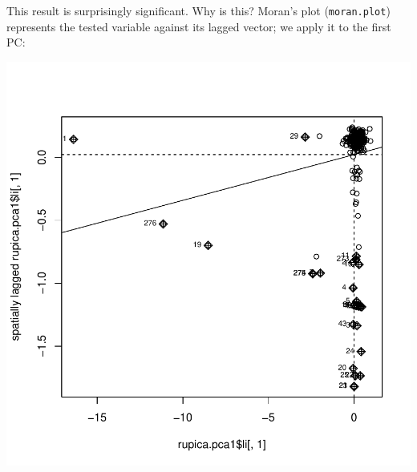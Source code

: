 \documentclass{article}
\begin{document}
\noindent This result is surprisingly significant. Why is this?
Moran's plot (\texttt{moran.plot}) represents the tested variable against its lagged vector; we
apply it to the first PC:
\begin{Schunk}
\end{Schunk}
\includegraphics{figs/spca-044}
\end{document}
